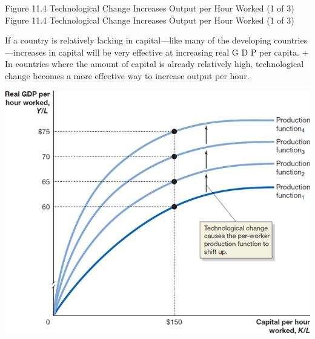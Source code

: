 \documentclass[
  12pt,
  ignorenonframetext,
]{beamer}
\begin{document}
\begin{frame}{Figure 11.4 Technological Change Increases Output per Hour
Worked (1 of 3)}
\protect\hypertarget{figure-11.4-technological-change-increases-output-per-hour-worked-1-of-3}{}
Figure 11.4 Technological Change Increases Output per Hour Worked (1 of
3)

If a country is relatively lacking in capital---like many of the
developing countries---increases in capital will be very effective at
increasing real G D P per capita. + In countries where the amount of
capital is already relatively high, technological change becomes a more
effective way to increase output per hour.

\includegraphics[width=\textwidth,height=0.99\textheight]{imgs3/img_slide20a.png}
\end{frame}
\end{document}
